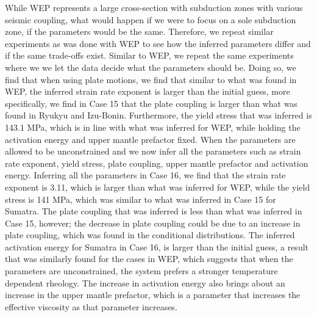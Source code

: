\documentclass[12pt]{article}
\begin{document}
{While WEP represents a large cross-section with subduction zones with various seismic coupling, what would happen if we were to focus on a sole subduction zone, if the parameters would be the same. Therefore, we repeat similar experiments as was done with WEP to see how the inferred parameters differ and if the same trade-offs exist. Similar to WEP, we repeat the same experiments where we we let the data decide what the parameters should be. Doing so, we find that when using plate motions, we find that similar to what was found in WEP, the inferred strain rate exponent is larger than the initial guess, more specifically, we find in Case 15 that the plate coupling is larger than what was found in Ryukyu and Izu-Bonin. Furthermore, the yield stress that was inferred is 143.1 MPa, which is in line with what was inferred for WEP, while holding the activation energy and upper mantle prefactor fixed. When the parameters are allowed to be unconstrained and we now infer all the parameters such as strain rate exponent, yield stress, plate coupling, upper mantle prefactor and activation energy. Inferring all the parameters in Case 16, we find that the strain rate exponent is 3.11, which is larger than what was inferred for WEP, while the yield stress is 141 MPa, which was similar to what was inferred in Case 15 for Sumatra. The plate coupling that was inferred is less than what was inferred in Case 15, however; the decrease in plate coupling could be due to an increase in plate coupling, which was found in the conditional distributions. The inferred activation energy for Sumatra in Case 16, is larger than the initial guess, a result that was similarly found for the cases in WEP, which suggests that when the parameters are unconstrained, the system prefers a stronger temperature dependent rheology. The increase in activation energy also brings about an increase in the upper mantle prefactor, which is a parameter that increases the effective viscosity as that parameter increases. 

}
\end{document}
